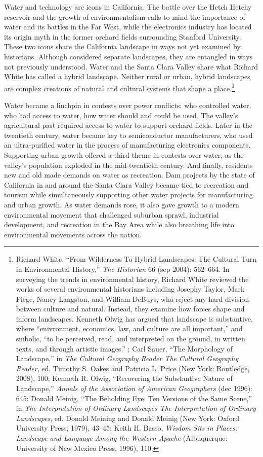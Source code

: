 \documentclass[11pt,article,oneside]{memoir}
\begin{document}
Water and technology are icons in California. The battle over the Hetch
Hetchy reservoir and the growth of environmentalism calls to mind the
importance of water and its battles in the Far West, while the
electronics industry has located its origin myth in the former orchard
fields surrounding Stanford University. These two icons share the
California landscape in ways not yet examined by historians. Although
considered separate landscapes, they are entangled in ways not
previously understood. Water and the Santa Clara Valley share what
Richard White has called a hybrid landscape. Neither rural or urban,
hybrid landscapes are complex creations of natural and cultural systems
that shape a place.\footnote{Richard White, ``From Wilderness To Hybrid
  Landscapes: The Cultural Turn in Environmental History,'' \emph{The
  Historian} 66 (sep 2004): 562--664. In surveying the trends in
  environmental history, Richard White reviewed the works of several
  environmental historians including Josephy Taylor, Mark Fiege, Nancy
  Langston, and William DeBuys, who reject any hard division between
  culture and natural. Instead, they examine how forces shape and inform
  landscapes. Kenneth Olwig has argued that landscape is substantive,
  where ``enivronment, economics, law, and culture are all important,''
  and smbolic, ``to be perceived, read, and interpreted on the ground,
  in written texts, and through artistic images.'' ; Carl Sauer, ``The
  Morphology of Landscape,'' in \emph{The Cultural Geography Reader The
  Cultural Geography Reader}, ed. Timothy S. Oakes and Patricia L. Price
  (New York: Routledge, 2008), 100; Kenneth R. Olwig, ``Recovering the
  Substantive Nature of Landscape,'' \emph{Annals of the Association of
  American Geographers} (dec 1996): 645; Donald Meinig, ``The Beholding
  Eye: Ten Versions of the Same Scene,'' in \emph{The Interpretation of
  Ordinary Landscapes The Interpretation of Ordinary Landscapes}, ed.
  Donald Meining and Donald Meinig (New York: Oxford University Press,
  1979), 43--45; Keith H. Basso, \emph{Wisdom Sits in Places: Landscape
  and Language Among the Western Apache} (Albuquerque: University of New
  Mexico Press, 1996), 110.}

Water became a linchpin in contests over power conflicts: who controlled
water, who had access to water, how water should and could be used. The
valley's agricultural past required access to water to support orchard
fields. Later in the twentieth century, water became key to
semiconductor manufacturers, who used an ultra-purified water in the
process of manufacturing electronics components. Supporting urban growth
offered a third theme in contests over water, as the valley's population
exploded in the mid-twentieth century. And finally, residents new and
old made demands on water as recreation. Dam projects by the state of
California in and around the Santa Clara Valley became tied to
recreation and tourism while simultaneously supporting other water
projects for manufacturing and urban growth. As water demands rose, it
also gave growth to a modern environmental movement that challenged
suburban sprawl, industrial development, and recreation in the Bay Area
while also breathing life into environmental movements across the
nation.
\end{document}
